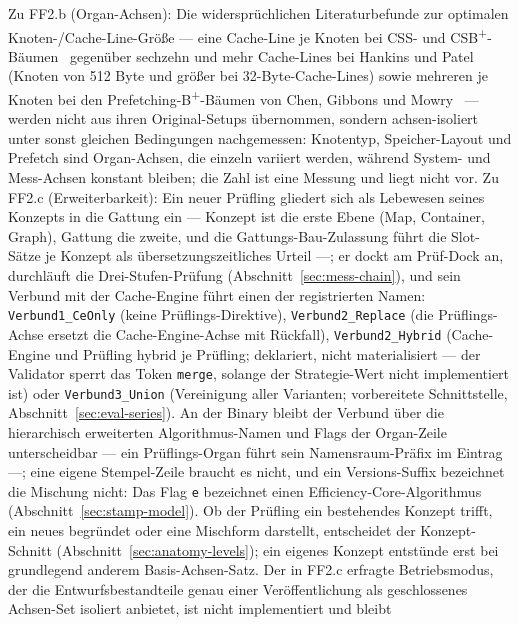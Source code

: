 \begin{nurlang}
Zu FF2.b (Organ-Achsen): Die widersprüchlichen Literaturbefunde zur optimalen Knoten-/Cache-Line-Größe
--- eine Cache-Line je Knoten bei CSS- und CSB\textsuperscript{+}-Bäumen~\cite{rao1999css,rao2000csb}
gegenüber sechzehn und mehr Cache-Lines bei Hankins und Patel~\cite{hankins2003nodesize} (Knoten von
512 Byte und größer bei 32-Byte-Cache-Lines) sowie mehreren je Knoten bei den
Prefetching-B\textsuperscript{+}-Bäumen von Chen, Gibbons und Mowry~\cite{chen2001prefetch} --- werden nicht aus
ihren Original-Setups übernommen, sondern achsen-isoliert unter sonst gleichen Bedingungen
nachgemessen: Knotentyp, Speicher-Layout und Prefetch sind Organ-Achsen, die einzeln variiert werden,
während System- und Mess-Achsen konstant bleiben; die Zahl ist eine Messung und liegt nicht vor. Zu FF2.c
(Erweiterbarkeit): Ein neuer Prüfling gliedert sich als Lebewesen seines Konzepts in die Gattung ein ---
Konzept ist die erste Ebene (Map, Container, Graph), Gattung die zweite, und die Gattungs-Bau-Zulassung
führt die Slot-Sätze je Konzept als übersetzungszeitliches Urteil ---; er dockt am Prüf-Dock an,
durchläuft die Drei-Stufen-Prüfung (Abschnitt~\ref{sec:mess-chain}), und sein Verbund mit der
Cache-Engine führt einen der registrierten Namen: \texttt{Verbund1\_CeOnly} (keine
Prüflings-Direktive), \texttt{Verbund2\_Replace} (die Prüflings-Achse ersetzt die Cache-Engine-Achse
mit Rückfall), \texttt{Verbund2\_Hybrid} (Cache-Engine und Prüfling hybrid je Prüfling; deklariert,
nicht materialisiert --- der Validator sperrt das Token \texttt{merge}, solange der Strategie-Wert nicht implementiert ist)
oder \texttt{Verbund3\_Union} (Vereinigung aller Varianten; vorbereitete Schnittstelle,
Abschnitt~\ref{sec:eval-series}). An der Binary bleibt der Verbund über die hierarchisch erweiterten
Algorithmus-Namen und Flags der Organ-Zeile unterscheidbar --- ein Prüflings-Organ führt sein
Namensraum-Präfix im Eintrag ---; eine eigene Stempel-Zeile braucht es nicht, und ein Versions-Suffix
bezeichnet die Mischung nicht: Das Flag \texttt{e} bezeichnet einen Efficiency-Core-Algorithmus
(Abschnitt~\ref{sec:stamp-model}). Ob der Prüfling ein bestehendes Konzept trifft, ein neues
begründet oder eine Mischform darstellt, entscheidet der Konzept-Schnitt
(Abschnitt~\ref{sec:anatomy-levels}); ein eigenes Konzept entstünde erst bei grundlegend anderem
Basis-Achsen-Satz. Der in FF2.c erfragte Betriebsmodus, der die Entwurfsbestandteile genau einer
Veröffentlichung als geschlossenes Achsen-Set isoliert anbietet, ist nicht implementiert und bleibt

\end{nurlang}
